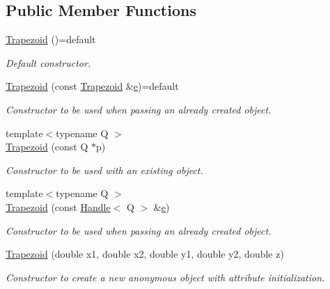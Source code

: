 \subsection*{Public Member Functions}
\begin{DoxyCompactItemize}
\item 
\hyperlink{class_d_d4hep_1_1_geometry_1_1_trapezoid_a2233ae95542275437ad2b479c37cdb72}{Trapezoid} ()=default
\begin{DoxyCompactList}\small\item\em Default constructor. \end{DoxyCompactList}\item 
\hyperlink{class_d_d4hep_1_1_geometry_1_1_trapezoid_a7133b1bf2eb1d878bfc880ade4566867}{Trapezoid} (const \hyperlink{class_d_d4hep_1_1_geometry_1_1_trapezoid}{Trapezoid} \&\hyperlink{_volumes_8cpp_a8a9a1f93e9b09afccaec215310e64142}{e})=default
\begin{DoxyCompactList}\small\item\em Constructor to be used when passing an already created object. \end{DoxyCompactList}\item 
{\footnotesize template$<$typename Q $>$ }\\\hyperlink{class_d_d4hep_1_1_geometry_1_1_trapezoid_a257a1d8f82d51fdd31be2190ae57b20a}{Trapezoid} (const Q $\ast$p)
\begin{DoxyCompactList}\small\item\em Constructor to be used with an existing object. \end{DoxyCompactList}\item 
{\footnotesize template$<$typename Q $>$ }\\\hyperlink{class_d_d4hep_1_1_geometry_1_1_trapezoid_a4d6d48925139c1e92002ffebedc9cd5c}{Trapezoid} (const \hyperlink{class_d_d4hep_1_1_handle}{Handle}$<$ Q $>$ \&\hyperlink{_volumes_8cpp_a8a9a1f93e9b09afccaec215310e64142}{e})
\begin{DoxyCompactList}\small\item\em Constructor to be used when passing an already created object. \end{DoxyCompactList}\item 
\hyperlink{class_d_d4hep_1_1_geometry_1_1_trapezoid_a3c8b1150038001c51909aab4350c7228}{Trapezoid} (double x1, double x2, double y1, double y2, double z)
\begin{DoxyCompactList}\small\item\em Constructor to create a new anonymous object with attribute initialization. \end{DoxyCompactList}\item 

\end{DoxyCompactItemize}
